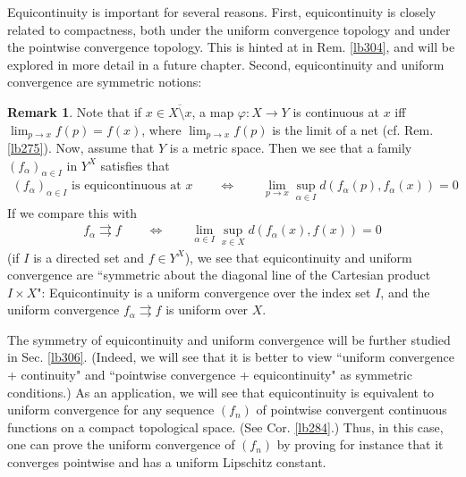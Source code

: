 \documentclass[12pt,b5paper,notitlepage]{article}
\theoremstyle{definition}
\newtheorem{rem}[df]{Remark}
\theoremstyle{plain}
\newcommand{\ovl}{\overline}
\newcommand{\eps}{\varepsilon}
\numberwithin{equation}{section}
\begin{document}
Equicontinuity is important for several reasons. First, equicontinuity is closely related to compactness, both under the uniform convergence topology and under the pointwise convergence topology. This is hinted at in Rem. \ref{lb304}, and will be explored in more detail in a future chapter. Second, equicontinuity and uniform convergence are symmetric notions:

\begin{rem}
Note that if $x\in \ovl{X\setminus x}$, a map $\varphi:X\rightarrow Y$ is continuous at $x$ iff $\lim_{p\rightarrow x}f(p)=f(x)$, where $\lim_{p\rightarrow x}f(p)$ is the limit of a net (cf. Rem. \ref{lb275}). Now, assume that $Y$ is a metric space. Then we see that a family $(f_\alpha)_{\alpha\in I}$ in $Y^X$ satisfies that
\begin{align}
(f_\alpha)_{\alpha\in I}\text{ is equicontinuous at }x\qquad\Longleftrightarrow\qquad\lim_{p\rightarrow x}\sup_{\alpha\in I}d(f_\alpha(p),f_\alpha(x))=0
\end{align} 
If we compare this with
\begin{align}
f_\alpha\rightrightarrows f \qquad\Longleftrightarrow\qquad \lim_{\alpha\in I}\sup_{x\in X}d(f_\alpha(x),f(x))=0
\end{align}
(if $I$ is a directed set and $f\in Y^X$), we see that equicontinuity and uniform convergence are ``symmetric about the diagonal line of the Cartesian product $I\times X$": Equicontinuity is a uniform convergence over the index set $I$, and the uniform convergence $f_\alpha\rightrightarrows f$ is uniform over $X$.
\end{rem}



The symmetry of equicontinuity and uniform convergence will be further studied in Sec. \ref{lb306}. (Indeed, we will see that it is better to view ``uniform convergence + continuity" and ``pointwise convergence + equicontinuity" as symmetric conditions.) As an application, we will see that equicontinuity is equivalent to uniform convergence for any sequence $(f_n)$ of pointwise convergent continuous functions on a compact topological space. (See Cor. \ref{lb284}.) Thus, in this case, one can prove the uniform convergence of $(f_n)$ by proving for instance that it converges pointwise and has a uniform Lipschitz constant.







\begin{comment}

By \eqref{eq78}, the uniform topology of $Y^I$ has a base generated by $\{V_{(y_\alpha)}^\eps:(y_\alpha)\in Y^I,\eps>0\}$ where
\begin{align*}
V_{(y_\alpha)}^\eps=\Big\{(y'_\alpha)\in Y^I:\sup_{\alpha\in I}d(y'_\alpha,y_\alpha)<\eps\Big\}
\end{align*}
So the equivalence of (1) and (2) follows immediately from the base version of Def. \ref{lb188}-(2).
\end{comment}
\end{document}
